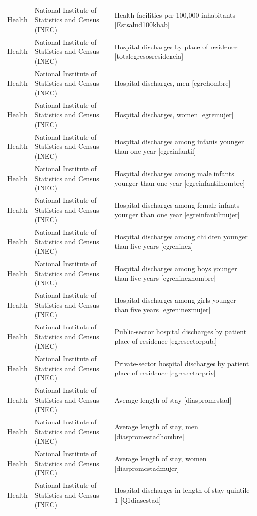 \documentclass[10pt,a4paper]{article}
\begin{document}
\begin{longtable}{@{}>{\raggedright\arraybackslash}p{3.5cm}>{\raggedright\arraybackslash}p{5.6cm}>{\raggedright\arraybackslash}p{\dimexpr\textwidth-9.1cm-4\tabcolsep\relax}@{}}
Health & National Institute of Statistics and Census (INEC) & Health facilities per 100,000 inhabitants [Estsalud100khab]\\
Health & National Institute of Statistics and Census (INEC) & Hospital discharges by place of residence [totalegresosresidencia]\\
Health & National Institute of Statistics and Census (INEC) & Hospital discharges, men [egrehombre]\\
Health & National Institute of Statistics and Census (INEC) & Hospital discharges, women [egremujer]\\
Health & National Institute of Statistics and Census (INEC) & Hospital discharges among infants younger than one year [egreinfantil]\\
Health & National Institute of Statistics and Census (INEC) & Hospital discharges among male infants younger than one year [egreinfantilhombre]\\
Health & National Institute of Statistics and Census (INEC) & Hospital discharges among female infants younger than one year [egreinfantilmujer]\\
Health & National Institute of Statistics and Census (INEC) & Hospital discharges among children younger than five years [egreninez]\\
Health & National Institute of Statistics and Census (INEC) & Hospital discharges among boys younger than five years [egreninezhombre]\\
Health & National Institute of Statistics and Census (INEC) & Hospital discharges among girls younger than five years [egreninezmujer]\\
Health & National Institute of Statistics and Census (INEC) & Public-sector hospital discharges by patient place of residence [egresectorpubl]\\
Health & National Institute of Statistics and Census (INEC) & Private-sector hospital discharges by patient place of residence [egresectorpriv]\\
Health & National Institute of Statistics and Census (INEC) & Average length of stay [diaspromestad]\\
Health & National Institute of Statistics and Census (INEC) & Average length of stay, men [diaspromestadhombre]\\
Health & National Institute of Statistics and Census (INEC) & Average length of stay, women [diaspromestadmujer]\\
Health & National Institute of Statistics and Census (INEC) & Hospital discharges in length-of-stay quintile 1 [Q1diasestad]\\

\end{longtable}
\end{document}
